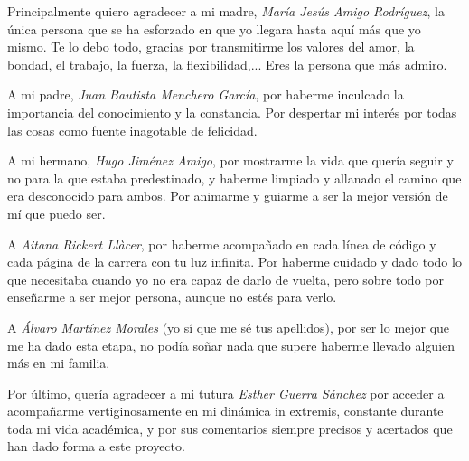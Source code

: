 
Principalmente quiero agradecer a mi madre, \textit{María Jesús Amigo Rodríguez}, la única persona que se ha esforzado en que yo llegara hasta aquí más que yo mismo. Te lo debo todo, gracias por transmitirme los valores del amor, la bondad, el trabajo, la fuerza, la flexibilidad,... Eres la persona que más admiro.

A mi padre, \textit{Juan Bautista Menchero García}, por haberme inculcado la importancia del conocimiento y la constancia. Por despertar mi interés por todas las cosas como fuente inagotable de felicidad.

A mi hermano, \textit{Hugo Jiménez Amigo}, por mostrarme la vida que quería seguir y no para la que estaba predestinado, y haberme limpiado y allanado el camino que era desconocido para ambos. Por animarme y guiarme a ser la mejor versión de mí que puedo ser.

A \textit{Aitana Rickert Llàcer}, por haberme acompañado en cada línea de código y cada página de la carrera con tu luz infinita. Por haberme cuidado y dado todo lo que necesitaba cuando yo no era capaz de darlo de vuelta, pero sobre todo por enseñarme a ser mejor persona, aunque no estés para verlo.

A \textit{Álvaro Martínez Morales} (yo sí que me sé tus apellidos), por ser lo mejor que me ha dado esta etapa, no podía soñar nada que supere haberme llevado alguien más en mi familia.

Por último, quería agradecer a mi tutura \textit{Esther Guerra Sánchez} por acceder a acompañarme vertiginosamente en mi dinámica in extremis, constante durante toda mi vida académica, y por sus comentarios siempre precisos y acertados que han dado forma a este proyecto.
